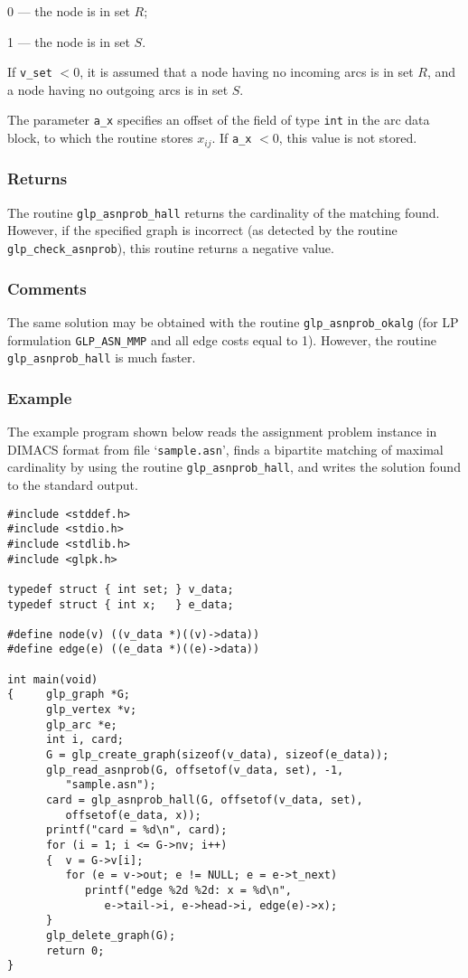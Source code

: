 \documentclass[dvipdfm,11pt]{report}
\begin{document}
0 --- the node is in set $R$;

1 --- the node is in set $S$.

\noindent
If \verb|v_set| $<0$, it is assumed that a node having no incoming arcs
is in set $R$, and a node having no outgoing arcs is in set $S$.

The parameter \verb|a_x| specifies an offset of the field of type
\verb|int| in the arc data block, to which the routine stores $x_{ij}$.
If \verb|a_x| $<0$, this value is not stored.

\subsubsection*{Returns}

The routine \verb|glp_asnprob_hall| returns the cardinality of the
matching found. However, if the specified graph is incorrect (as
detected by the routine \verb|glp_check_asnprob|), this routine returns
a negative value.

\subsubsection*{Comments}

The same solution may be obtained with the routine
\verb|glp_asnprob_okalg| (for LP formulation \verb|GLP_ASN_MMP| and
all edge costs equal to 1). However, the routine \verb|glp_asnprob_hall|
is much faster.

\newpage

\subsubsection*{Example}

The example program shown below reads the assignment problem instance
in DIMACS format from file `\verb|sample.asn|', finds a bipartite
matching of maximal cardinality by using the routine
\verb|glp_asnprob_hall|, and writes the solution found to the standard
output.

\begin{footnotesize}
\begin{verbatim}
#include <stddef.h>
#include <stdio.h>
#include <stdlib.h>
#include <glpk.h>

typedef struct { int set; } v_data;
typedef struct { int x;   } e_data;

#define node(v) ((v_data *)((v)->data))
#define edge(e) ((e_data *)((e)->data))

int main(void)
{     glp_graph *G;
      glp_vertex *v;
      glp_arc *e;
      int i, card;
      G = glp_create_graph(sizeof(v_data), sizeof(e_data));
      glp_read_asnprob(G, offsetof(v_data, set), -1,
         "sample.asn");
      card = glp_asnprob_hall(G, offsetof(v_data, set),
         offsetof(e_data, x));
      printf("card = %d\n", card);
      for (i = 1; i <= G->nv; i++)
      {  v = G->v[i];
         for (e = v->out; e != NULL; e = e->t_next)
            printf("edge %2d %2d: x = %d\n",
               e->tail->i, e->head->i, edge(e)->x);
      }
      glp_delete_graph(G);
      return 0;
}
\end{verbatim}
\end{footnotesize}
\end{document}
